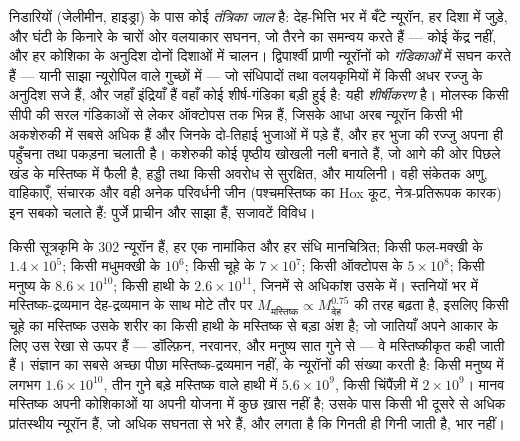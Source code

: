 \begin{definition}[तंत्रिका जाल, गंडिकाएँ और मस्तिष्क]\label{def:b3:nervous-systems:comparative}
निडारियों (जेलीमीन, हाइड्रा) के पास कोई \emph{तंत्रिका जाल} है:
देह-भित्ति भर में बँटे न्यूरॉन, हर दिशा में जुड़े, और घंटी के किनारे के
चारों ओर वलयाकार सघनन, जो तैरने का समन्वय करते हैं --- कोई केंद्र नहीं,
और हर कोशिका के अनुदिश दोनों दिशाओं में चालन। द्विपार्श्वी प्राणी
न्यूरॉनों को \emph{गंडिकाओं} में सघन करते हैं --- यानी साझा न्यूरोपिल
वाले गुच्छों में --- जो संधिपादों तथा वलयकृमियों में किसी अधर रज्जु के
अनुदिश सजे हैं, और जहाँ इंद्रियाँ हैं वहाँ कोई शीर्ष-गंडिका बड़ी हुई
है: यही \emph{शीर्षीकरण} है। मोलस्क किसी सीपी की सरल गंडिकाओं से लेकर
ऑक्टोपस तक भिन्न हैं, जिसके आधा अरब न्यूरॉन किसी भी अकशेरुकी में सबसे
अधिक हैं और जिनके दो-तिहाई भुजाओं में पड़े हैं, और हर भुजा की रज्जु
अपना ही पहुँचना तथा पकड़ना चलाती है। कशेरुकी कोई पृष्ठीय खोखली नली
बनाते हैं, जो आगे की ओर पिछले खंड के मस्तिष्क में फैली है, हड्डी तथा
किसी अवरोध से सुरक्षित, और मायलिनी। वही संकेतक अणु, वाहिकाएँ,
संचारक और वही अनेक परिवर्धनी जीन (पश्चमस्तिष्क का Hox कूट,
नेत्र-प्रतिरूपक कारक) इन सबको चलाते हैं: पुर्जे प्राचीन और साझा हैं,
सजावटें विविध।
\end{definition}

\begin{example}[न्यूरॉन गिनना]\label{ex:b3:nervous-systems:counts}
किसी सूत्रकृमि के $302$ न्यूरॉन हैं, हर एक नामांकित और हर संधि
मानचित्रित; किसी फल-मक्खी के $1.4\times 10^{5}$; किसी मधुमक्खी के
$10^{6}$; किसी चूहे के $7\times 10^{7}$; किसी ऑक्टोपस के $5\times 10^{8}$;
किसी मनुष्य के $8.6\times
10^{10}$; किसी हाथी के
$2.6\times 10^{11}$, जिनमें से अधिकांश उसके  में।
स्तनियों भर में मस्तिष्क-द्रव्यमान देह-द्रव्यमान के साथ मोटे तौर पर
$M_{\text{मस्तिष्क}} \propto M_{\text{देह}}^{0.75}$ की तरह बढ़ता है,
इसलिए किसी चूहे का मस्तिष्क उसके शरीर का किसी हाथी के मस्तिष्क से बड़ा
अंश है; जो जातियाँ अपने आकार के लिए उस रेखा से ऊपर हैं --- डॉल्फ़िन,
नरवानर, और मनुष्य सात गुने से --- वे मस्तिष्कीकृत कही जाती हैं।
संज्ञान का सबसे अच्छा पीछा मस्तिष्क-द्रव्यमान नहीं,  के न्यूरॉनों की संख्या करती है: किसी मनुष्य में लगभग
$1.6\times 10^{10}$, तीन गुने बड़े मस्तिष्क वाले हाथी में
$5.6\times 10^{9}$, किसी चिंपैंज़ी में $2\times 10^{9}$। मानव मस्तिष्क
अपनी कोशिकाओं या अपनी योजना में कुछ ख़ास नहीं है; उसके पास किसी भी
दूसरे से अधिक प्रांतस्थीय न्यूरॉन हैं, जो अधिक सघनता से भरे हैं, और
लगता है कि गिनती ही गिनी जाती है, भार नहीं।
\end{example}

